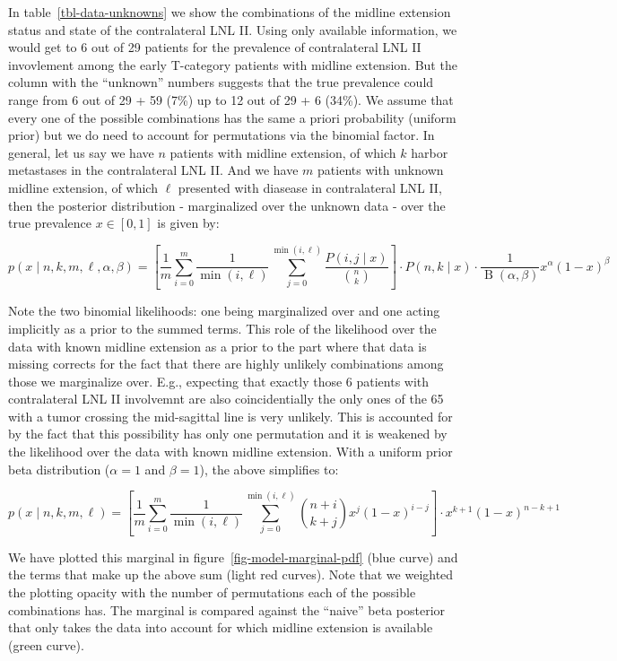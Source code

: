 \documentclass[
  sn-mathphys-num,
]{sn-jnl}
\begin{document}
In table~\ref{tbl-data-unknowns} we show the combinations of the midline
extension status and state of the contralateral LNL II. Using only
available information, we would get to 6 out of 29 patients for the
prevalence of contralateral LNL II invovlement among the early
T-category patients with midline extension. But the column with the
``unknown'' numbers suggests that the true prevalence could range from 6
out of 29 + 59 (7\%) up to 12 out of 29 + 6 (34\%). We assume that every
one of the possible combinations has the same a priori probability
(uniform prior) but we do need to account for permutations via the
binomial factor. In general, let us say we have \(n\) patients with
midline extension, of which \(k\) harbor metastases in the contralateral
LNL II. And we have \(m\) patients with unknown midline extension, of
which \(\ell\) presented with diasease in contralateral LNL II, then the
posterior distribution - marginalized over the unknown data - over the
true prevalence \(x \in \left[ 0, 1 \right]\) is given by:

\[
p(x \mid n, k, m, \ell, \alpha, \beta) = \left[ \frac{1}{m} \sum_{i=0}^m \frac{1}{\min(i,\ell)} \sum_{j=0}^{\min(i,\ell)} \frac{P(i, j \mid x )}{\binom{n}{k}} \right] \cdot P(n, k \mid x) \cdot \frac{1}{\operatorname{B}(\alpha, \beta)} x^\alpha (1-x)^\beta
\]

Note the two binomial likelihoods: one being marginalized over and one
acting implicitly as a prior to the summed terms. This role of the
likelihood over the data with known midline extension as a prior to the
part where that data is missing corrects for the fact that there are
highly unlikely combinations among those we marginalize over. E.g.,
expecting that exactly those 6 patients with contralateral LNL II
involvemnt are also coincidentially the only ones of the 65 with a tumor
crossing the mid-sagittal line is very unlikely. This is accounted for
by the fact that this possibility has only one permutation and it is
weakened by the likelihood over the data with known midline extension.
With a uniform prior beta distribution (\(\alpha=1\) and \(\beta=1\)),
the above simplifies to:

\[
p(x \mid n, k, m, \ell) = \left[ \frac{1}{m} \sum_{i=0}^m \frac{1}{\min(i,\ell)} \sum_{j=0}^{\min(i,\ell)} \binom{n+i}{k+j} x^j (1 - x)^{i-j} \right] \cdot x^{k+1} (1 - x)^{n-k+1}
\]

We have plotted this marginal in figure~\ref{fig-model-marginal-pdf}
(blue curve) and the terms that make up the above sum (light red
curves). Note that we weighted the plotting opacity with the number of
permutations each of the possible combinations has. The marginal is
compared against the ``naive'' beta posterior that only takes the data
into account for which midline extension is available (green curve).
\end{document}
